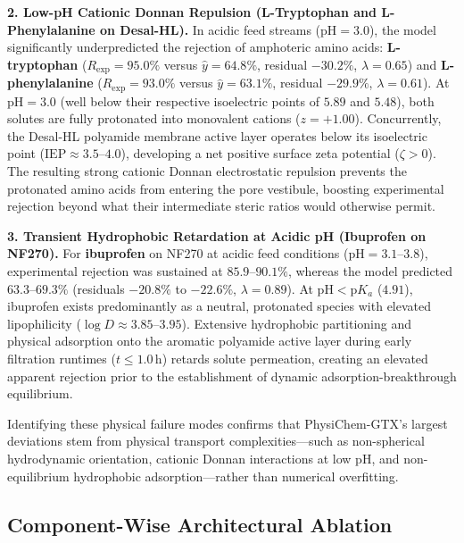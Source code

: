 \documentclass[11pt]{article}
\begin{document}
\textbf{2. Low-pH Cationic Donnan Repulsion (L-Tryptophan and L-Phenylalanine on Desal-HL).} In acidic feed streams ($\mathrm{pH} = 3.0$), the model significantly underpredicted the rejection of amphoteric amino acids: \textbf{L-tryptophan} ($R_{\mathrm{exp}} = 95.0\%$ versus $\hat{y} = 64.8\%$, residual $-30.2\%$, $\lambda = 0.65$) and \textbf{L-phenylalanine} ($R_{\mathrm{exp}} = 93.0\%$ versus $\hat{y} = 63.1\%$, residual $-29.9\%$, $\lambda = 0.61$). At $\mathrm{pH} = 3.0$ (well below their respective isoelectric points of $5.89$ and $5.48$), both solutes are fully protonated into monovalent cations ($z = +1.00$). Concurrently, the Desal-HL polyamide membrane active layer operates below its isoelectric point ($\mathrm{IEP} \approx 3.5\text{--}4.0$), developing a net positive surface zeta potential ($\zeta > 0$). The resulting strong cationic Donnan electrostatic repulsion prevents the protonated amino acids from entering the pore vestibule, boosting experimental rejection beyond what their intermediate steric ratios would otherwise permit.

\textbf{3. Transient Hydrophobic Retardation at Acidic pH (Ibuprofen on NF270).} For \textbf{ibuprofen} on NF270 at acidic feed conditions ($\mathrm{pH} = 3.1\text{--}3.8$), experimental rejection was sustained at $85.9\text{--}90.1\%$, whereas the model predicted $63.3\text{--}69.3\%$ (residuals $-20.8\%$ to $-22.6\%$, $\lambda = 0.89$). At $\mathrm{pH} < \mathrm{p}K_a$ ($4.91$), ibuprofen exists predominantly as a neutral, protonated species with elevated lipophilicity ($\log D \approx 3.85\text{--}3.95$). Extensive hydrophobic partitioning and physical adsorption onto the aromatic polyamide active layer during early filtration runtimes ($t \leq 1.0\,\mathrm{h}$) retards solute permeation, creating an elevated apparent rejection prior to the establishment of dynamic adsorption-breakthrough equilibrium.

Identifying these physical failure modes confirms that PhysiChem-GTX's largest deviations stem from physical transport complexities---such as non-spherical hydrodynamic orientation, cationic Donnan interactions at low pH, and non-equilibrium hydrophobic adsorption---rather than numerical overfitting.

\subsection{Component-Wise Architectural Ablation}
\label{subsec:ablation}
\end{document}

